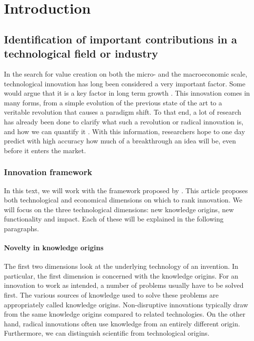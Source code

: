 \chapter{Introduction}
\section{Identification of important contributions in a technological field or industry}
In the search for value creation on both the micro- and the macroeconomic scale,
technological innovation has long been considered a very important factor. Some
would argue that it is a key factor in long term growth \cite{arts}. This
innovation comes in many forms, from a simple evolution of the previous state of
the art to a veritable revolution that causes a paradigm shift. To that end, a
lot of research has already been done to clarify what such a revolution or
radical innovation is, and how we can quantify it \cite{structure, invention,
verhoeven}. With this information, researchers hope to one day predict with
high accuracy how much of a breakthrough an idea will be, even before it enters
the market.

\subsection{Innovation framework}
In this text, we will work with the framework proposed by \cite{verhoeven}.
This article proposes both technological and economical dimensions on which to
rank innovation. We will focus on the three technological dimensions: new
knowledge origins, new functionality and impact. Each of these will be explained
in the following paragraphs.

\subsubsection{Novelty in knowledge origins}
The first two dimensions look at the underlying technology of an invention. In
particular, the first dimension is concerned with the knowledge origins. For an
innovation to work as intended, a number of problems usually have to be solved
first. The various sources of knowledge used to solve these problems are
appropriately called knowledge origins. Non-disruptive innovations typically
draw from the same knowledge origins compared to related technologies. On the
other hand, radical innovations often use knowledge from an entirely different
origin. Furthermore, we can distinguish scientific from technological origins.

